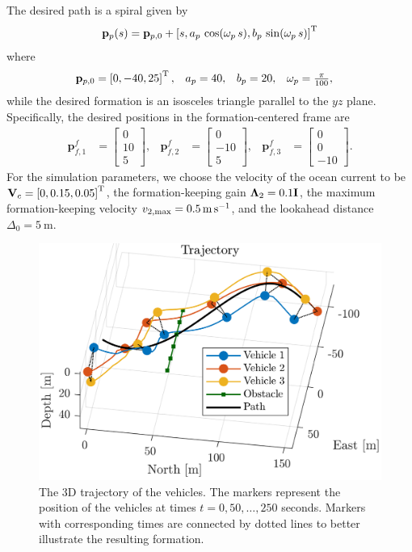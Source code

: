 The desired path is a spiral given by 
\begin{equation}
    \mathbf{p}_p(s) = \mathbf{p}_{p, 0} + \left[s, a_p\,\cos(\omega_p\,s), b_p\,\sin(\omega_p\,s)\right]^{\mathrm{T}}
\end{equation}
where 
\begin{align*}
    \mat{p}_{p, 0} &= \inlinevector{0, -40, 25}, &
    a_p &= 40, &
    b_p &= 20, &
    \omega_p &= \scale[1]{\frac{\pi}{100}},
\end{align*}
while the desired formation is an isosceles triangle parallel to the $yz$ plane.
Specifically, the desired positions in the formation-centered frame are 
\begin{align}
    \mathbf{p}_{f,1}^f &= \begin{bmatrix} 0 \\ 10 \\ 5\end{bmatrix}, &
    \mathbf{p}_{f,2}^f &= \begin{bmatrix} 0 \\ -10 \\ 5\end{bmatrix}, &
    \mathbf{p}_{f,3}^f &= \begin{bmatrix} 0 \\ 0 \\ -10\end{bmatrix}.
\end{align}
For the simulation parameters, we choose the velocity of the ocean current to be $\mathbf{V}_c = \left[0, 0.15, 0.05\right]^{\mathrm{T}}$, the formation-keeping gain $\bm{\Lambda}_2 = 0.1\mathbf{I}$, the maximum formation-keeping velocity $v_{2, \max} = \SI{0.5}{\meter\per\second}$, and the lookahead distance $\Delta_0 = \SI{5}{\meter}$.

\begin{figure}[t]
    \centering
    \includegraphics[width=.65\textwidth]{figures/nsb_R/trajectory.png}
    \vspace{-2mm}
    \caption{The 3D trajectory of the vehicles. The markers represent the position of the vehicles at times $t = 0, 50, \ldots, 250$ seconds. Markers with corresponding times are connected by dotted lines to better illustrate the resulting formation.}
    \label{fig:NSB_R_trajectory}
    \vspace*{-4mm}
\end{figure}

